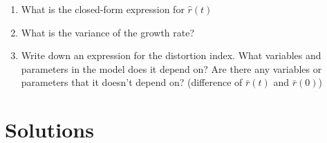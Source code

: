 \documentclass[]{book}
\providecommand{\tightlist}{%
  \setlength{\itemsep}{0pt}\setlength{\parskip}{0pt}}
\begin{document}
\begin{enumerate}
  \begin{enumerate}
  \def\labelenumii{\alph{enumii}.}
  \tightlist
  \item
    What is the closed-form expression for \(\hat{r}(t)\)\\
  \item
    What is the variance of the growth rate?\\
  \item
    Write down an expression for the distortion index. What variables and parameters in the model does it depend on? Are there any variables or parameters that it doesn't depend on? (difference of \(\bar{r}(t)\) and \(\bar{r}(0)\))
  \end{enumerate}
\end{enumerate}

\hypertarget{solutions}{%
\section{Solutions}\label{solutions}}
\end{document}
